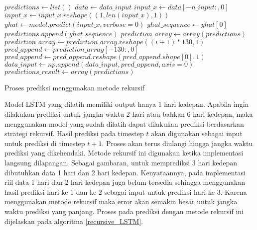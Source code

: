 \documentclass[../thesis.tex]{subfiles}
\begin{document}
\begin{algorithm}[htp]
	\begin{algorithmic}[1]
		\State $predictions \leftarrow list()$
			\State $data \leftarrow data\_input$
			\State $input\_x \leftarrow data[-n\_input:,0]$
			\State $input\_x \leftarrow input\_x.reshape((1, len(input\_x), 1))$
			\State $yhat \leftarrow model.predict(input\_x, verbose=0)$
			\State $yhat\_sequence \leftarrow yhat[0]$
			\State $predictions.append(yhat\_sequence)$
			\State $prediction\_array \leftarrow array(predictions)$
			\State $prediction\_array \leftarrow prediction\_array.reshape((i+1)*130, 1)$
			\State $pred\_append \leftarrow prediction\_array[-130:,0]$
			\State $pred\_append \leftarrow pred\_append.reshape(pred\_append.shape[0], 1)$
			\State $data\_input \leftarrow np.append(data\_input, pred\_append, axis=0)$
		\EndFor
		\State $predictions\_result \leftarrow array(predictions)$
	\EndFunction
	\end{algorithmic}
	\caption{Proses prediksi menggunakan metode rekursif}
	\label{recursive_LSTM}
\end{algorithm}
Model LSTM yang dilatih memiliki output hanya 1 hari kedepan. Apabila ingin dilakukan prediksi untuk jangka waktu 2 hari atau bahkan 6 hari kedepan, maka menggunakan model yang sudah dilatih dapat dilakukan prediksi berdasarkan strategi rekursif.
Hasil prediksi pada timestep $t$ akan digunakan sebagai input untuk prediksi di timestep $t+1$. Proses akan terus diulangi hingga jangka waktu prediksi yang dikehendaki. Metode rekursif ini digunakan ketika implementasi langsung dilapangan.
Sebagai gambaran, untuk memprediksi 3 hari kedepan dibutuhkan data 1 hari dan 2 hari kedepan. Kenyataannya, pada implementasi riil data 1 hari dan 2 hari kedepan juga belum tersedia sehingga menggunakan hasil prediksi hari ke 1 dan ke 2 sebagai input untuk prediksi hari ke 3.
Karena menggunakan metode rekursif maka error akan semakin besar untuk jangka waktu prediksi yang panjang.
Proses pada prediksi dengan metode rekursif ini dijelaskan pada algoritma \ref{recursive_LSTM}.
\end{document}
